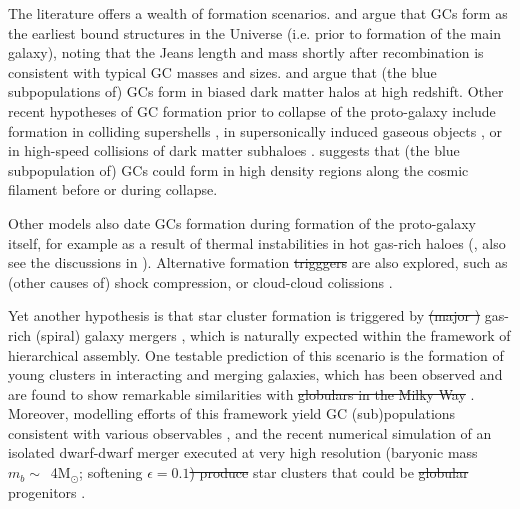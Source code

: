 \documentclass[a4paper,fleqn,usenatbib]{mnras}
\newcommand{\Sun}[0]{\ensuremath{_{\odot}}}
\providecommand{\DIFadd}[1]{{\protect\color{blue}\uwave{#1}}} %
\providecommand{\DIFdel}[1]{{\protect\color{red}\sout{#1}}}                      %
\providecommand{\DIFaddbegin}{} %
\providecommand{\DIFaddend}{} %
\providecommand{\DIFdelbegin}{} %
\providecommand{\DIFdelend}{} %
\newcommand{\DIFscaledelfig}{0.5}
\newlength{\DIFdelgraphicswidth} %
\newlength{\DIFdelgraphicsheight} %
\newcommand{\DIFaddincludegraphics}[2][]{{\color{blue}\fbox{\DIFOincludegraphics[#1]{#2}}}} %
\newcommand{\DIFdelincludegraphics}[2][]{%
\sbox{\DIFdelgraphicsbox}{\DIFOincludegraphics[#1]{#2}}%
\settoboxwidth{\DIFdelgraphicswidth}{\DIFdelgraphicsbox} %
\settoboxtotalheight{\DIFdelgraphicsheight}{\DIFdelgraphicsbox} %
\scalebox{\DIFscaledelfig}{%
\parbox[b]{\DIFdelgraphicswidth}{\usebox{\DIFdelgraphicsbox}\\[-\baselineskip] \rule{\DIFdelgraphicswidth}{0em}}\llap{\resizebox{\DIFdelgraphicswidth}{\DIFdelgraphicsheight}{%
\setlength{\unitlength}{\DIFdelgraphicswidth}%
\begin{picture}(1,1)%
\thicklines\linethickness{2pt} %
{\color[rgb]{1,0,0}\put(0,0){\framebox(1,1){}}}%
{\color[rgb]{1,0,0}\put(0,0){\line( 1,1){1}}}%
{\color[rgb]{1,0,0}\put(0,1){\line(1,-1){1}}}%
\end{picture}%
}\hspace*{3pt}}} %
} %
\DeclareRobustCommand{\DIFaddbegin}{\DIFOaddbegin \let\includegraphics\DIFaddincludegraphics} %
\DeclareRobustCommand{\DIFaddend}{\DIFOaddend \let\includegraphics\DIFOincludegraphics} %
\DeclareRobustCommand{\DIFdelbegin}{\DIFOdelbegin \let\includegraphics\DIFdelincludegraphics} %
\DeclareRobustCommand{\DIFdelend}{\DIFOaddend \let\includegraphics\DIFOincludegraphics} %
\begin{document}
The literature offers a wealth of formation scenarios. \citet{1968ApJ...154..891P}
and \citet{1984ApJ...277..470P} argue that GCs form as the earliest bound
structures in the Universe (i.e. prior to formation of the main galaxy), 
noting that the Jeans length and mass shortly after recombination is consistent
with typical GC masses and sizes. \citet{2005MNRAS.364..367D} and \citet{
2009ApJ...706L.192B} argue that (the blue subpopulations of) GCs form in \DIFaddbegin \DIFadd{radially
}\DIFaddend biased dark matter halos at high redshift. Other recent hypotheses of GC formation 
prior to collapse of the proto-galaxy include formation in colliding supershells 
\citep{2017Ap&SS.362..183R}, in supersonically induced gaseous objects
\citep{2019arXiv190408941C}, or in high-speed collisions of dark matter subhaloes
\citep{2019arXiv190508951M}. \citet{2017MNRAS.472.3120B} suggests
that (the blue subpopulation of) GCs could form in high density regions along
the cosmic filament before or during collapse.

Other models also date GCs formation during formation of the proto-galaxy itself,
for example as a result of thermal instabilities in hot gas-rich haloes 
(\citealt{1985ApJ...298...18F}, also see the discussions in \citealt{
1990ApJ...363..488K}). Alternative formation \DIFdelbegin \DIFdel{trigggers }\DIFdelend \DIFaddbegin \DIFadd{triggers }\DIFaddend are also explored, such as 
(other causes of) shock compression, or cloud-cloud colissions \citep[e.g.][]{
1980glcl.conf..301G, 1992ApJ...400..265M, 1994ApJ...429..177H, 1995ApJ...442..618V,
1996ASPC...92..241L, 2001ApJ...560..592C}. 

Yet another hypothesis is that star cluster formation is triggered by \DIFdelbegin \DIFdel{(major 
) 
}\DIFdelend \DIFaddbegin \DIFadd{major 
}\DIFaddend gas-rich (spiral) galaxy mergers \citep{1987nngp.proc...18S, 1992ApJ...384...50A},
which is naturally expected within the framework of hierarchical assembly. One
testable prediction of this scenario is the formation of young clusters in
interacting and merging galaxies, which has been observed and are found to show 
remarkable similarities with \DIFdelbegin \DIFdel{globulars in the Milky Way }\DIFdelend \DIFaddbegin \DIFadd{GCs in the MW }\DIFaddend \citep[e.g.][]{
1995AJ....109..960W, 1996AJ....112..416H, 1999AJ....118..752Z, 1999AJ....118.1551W}.
Moreover, modelling efforts of this framework yield GC (sub)populations consistent 
with various observables \citep[e.g.][]{2010ApJ...718.1266M, 2018MNRAS.480.2343C}, 
and the recent numerical simulation of an isolated dwarf-dwarf merger executed at 
very high resolution (baryonic mass $m_b \sim$~4M\Sun; softening $\epsilon = 0.1$\DIFdelbegin \DIFdel{) 
produce }\DIFdelend \DIFaddbegin \DIFadd{~pc) 
produces }\DIFaddend star clusters that could be \DIFdelbegin \DIFdel{globular }\DIFdelend \DIFaddbegin \DIFadd{GC }\DIFaddend progenitors \citep{
2019arXiv190509840L}.
\end{document}
